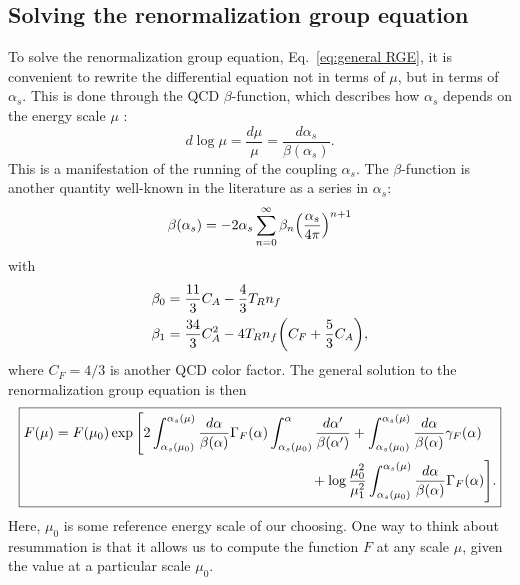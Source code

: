\documentclass[12pt,twoside,class=../reedthesis, crop=false]{standalone}
\begin{document}
\subsection{Solving the renormalization group equation}
	To solve the renormalization group equation, Eq.~\ref{eq:general RGE}, it is convenient to rewrite the differential equation not in terms of $\mu$, but in terms of $\alpha_s$. This is done through the QCD $\beta$-function, which describes how $\alpha_s$ depends on the energy scale $\mu$ \cite{frye_factorization_2016}:
	\begin{equation}\label{eq:beta function definition}
		d\log\mu = \frac{d\mu}{\mu} = \frac{d\alpha_s}{\beta(\alpha_s)}.
	\end{equation}
	This is a manifestation of the running of the coupling $\alpha_s$. The $\beta$-function is another quantity well-known in the literature as a series in $\alpha_s$:
	\begin{equation}
		\beta(\alpha_s) = -2\alpha_s \sum_{n = 0}^\infty \beta_n \qty(\frac{\alpha_s}{4\pi})^{n + 1}
	\end{equation}
	with \cite{frye_factorization_2016}
	\begin{equation}
	\begin{aligned}
		\beta_0 &= \frac{11}{3} C_A - \frac{4}{3}T_R n_f \\
		\beta_1 &= \frac{34}{3} C_A^2 - 4 T_R n_f \qty(C_F + \frac{5}{3} C_A),
	\end{aligned}
	\end{equation}
	where $C_F = 4/3$ is another QCD color factor. The general solution to the renormalization group equation is then \cite{frye_factorization_2016}
	\begin{equation}\label{eq:RGE general solution}
	\boxed{
	\begin{aligned}
		F(\mu) = F(\mu_0) \exp\Bigg[ 2 \int_{\alpha_s(\mu_0)}^{\alpha_s(\mu)} \frac{d\alpha}{\beta(\alpha)}\Gamma_F(\alpha) \int_{\alpha_s(\mu_0)}^\alpha \frac{d\alpha'}{\beta(\alpha')} &+ \int_{\alpha_s(\mu_0)}^{\alpha_s(\mu)} \frac{d\alpha}{\beta(\alpha)}\gamma_F(\alpha) \\
		&\hspace{-1cm}+ \log\frac{\mu_0^2}{\mu_1^2} \int_{\alpha_s(\mu_0)}^{\alpha_s(\mu)} \frac{d\alpha}{\beta(\alpha)}\Gamma_F(\alpha) \Bigg].
	\end{aligned}
	}
	\end{equation}
	Here, $\mu_0$ is some reference energy scale of our choosing. One way to think about resummation is that it allows us to compute the function $F$ at any scale $\mu$, given the value at a particular scale $\mu_0$.
\end{document}
